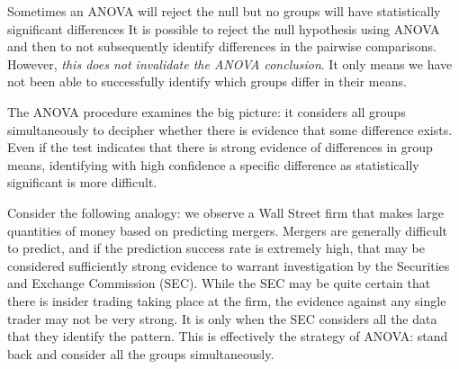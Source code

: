 \begin{caution} {Sometimes an ANOVA will reject the null but no groups will have statistically significant differences}
{It is possible to reject the null hypothesis using ANOVA and then to not subsequently identify differences in the pairwise comparisons. However, \emph{this does not invalidate the ANOVA conclusion}. It only means we have not been able to successfully identify which groups differ in their means.}
\end{caution}

The ANOVA procedure examines the big picture: it considers all groups simultaneously to decipher whether there is evidence that some difference exists. Even if the test indicates that there is strong evidence of differences in group means, identifying with high confidence a specific difference as statistically significant is more difficult.

Consider the following analogy: we observe a Wall Street firm that makes large quantities of money based on predicting mergers. Mergers are generally difficult to predict, and if the prediction success rate is extremely high, that may be considered sufficiently strong evidence to warrant investigation by the Securities and Exchange Commission (SEC). While the SEC may be quite certain that there is insider trading taking place at the firm, the evidence against any single trader may not be very strong. It is only when the SEC considers all the data that they identify the pattern. This is effectively the strategy of ANOVA: stand back and consider all the groups simultaneously.


